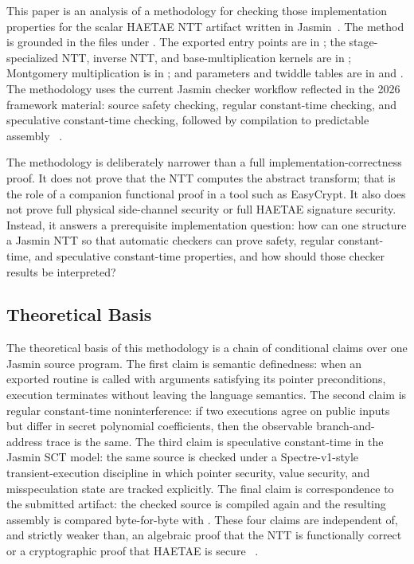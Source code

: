 \documentclass[10pt,twocolumn]{article}
\newcommand{\haetae}{HAETAE}
\newcommand{\jasmin}{Jasmin}
\newcommand{\ct}{constant-time}
\newcommand{\sct}{speculative constant-time}
\begin{document}
This paper is an analysis of a methodology for checking those implementation
properties for the scalar \haetae{} NTT artifact written in \jasmin{}~\cite{Jasmin2017}.
The method is grounded in the files under .  The exported entry
points are in ; the stage-specialized NTT, inverse NTT, and
base-multiplication kernels are in ; Montgomery multiplication
is in ; and parameters and twiddle tables are in
 and .  The methodology uses the current
\jasmin{} checker workflow reflected in the 2026 framework material: source
safety checking, regular constant-time checking, and speculative
constant-time checking, followed by compilation to predictable assembly
~\cite{Jasmin2017,LastMile2020,JasminFramework2026}.

The methodology is deliberately narrower than a full implementation-correctness
proof.  It does not prove that the NTT computes the abstract transform; that is
the role of a companion functional proof in a tool such as EasyCrypt.  It also
does not prove full physical side-channel security or full \haetae{} signature
security.  Instead, it answers a prerequisite implementation question: how can
one structure a \jasmin{} NTT so that automatic checkers can prove safety,
regular \ct{}, and \sct{} properties, and how should those checker results be
interpreted?

\subsection{Theoretical Basis}

The theoretical basis of this methodology is a chain of conditional claims over
one \jasmin{} source program.  The first claim is semantic definedness: when an
exported routine is called with arguments satisfying its pointer preconditions,
execution terminates without leaving the language semantics.  The second claim
is regular constant-time noninterference: if two executions agree on public
inputs but differ in secret polynomial coefficients, then the observable
branch-and-address trace is the same.  The third claim is speculative
constant-time in the Jasmin SCT model: the same source is checked under a
Spectre-v1-style transient-execution discipline in which pointer security,
value security, and misspeculation state are tracked explicitly.  The final
claim is correspondence to the submitted artifact: the checked source is
compiled again and the resulting assembly is compared byte-for-byte with
.  These four claims are independent of, and strictly weaker
than, an algebraic proof that the NTT is functionally correct or a
cryptographic proof that \haetae{} is secure
~\cite{JasminFramework2026,Oliveira2022Thesis,JasminDocs}.
\end{document}
